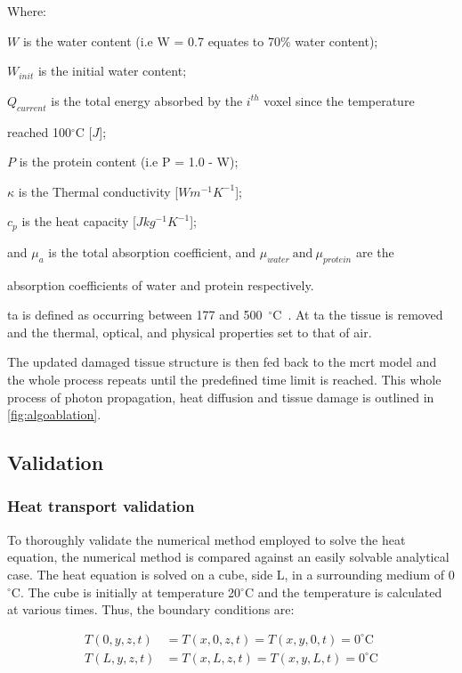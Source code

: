 \noindent Where:

\indent $W$ is the water content (i.e W = 0.7 equates to 70\% water content);

\indent $W_{init}$ is the initial water content;

\indent $Q_{current}$ is the total energy absorbed by the $i^{th}$ voxel since the temperature 

\indent reached 100$^{\circ}$C [$J$];

\indent $P$ is the protein content (i.e P = 1.0 - W);

\indent $\kappa$ is the Thermal conductivity [$W m^{-1} K^{-1}$];

\indent $c_p$ is the heat capacity [$J kg^{-1} K^{-1}$];

\indent and $\mu_a$ is the total absorption coefficient, and $\mu_{water}\ \text{and}\ \mu_{protein}$ are the

\indent absorption coefficients of water and protein respectively.

\medskip

\gls*{ta}  is defined as occurring between 177 and 500~$^{\circ}$C~\cite{gerstmann1994char,mckenzie1986three,sagi1992heating}. At \gls*{ta} the tissue is removed and the thermal, optical, and physical properties set to that of air.

The updated damaged tissue structure is then fed back to the \gls*{mcrt} model and the whole process repeats until the predefined time limit is reached. This whole process of photon propagation, heat diffusion and tissue damage is outlined in \cref{fig:algoablation}.

\subsection{Validation}

\subsubsection*{Heat transport validation}

To thoroughly validate the numerical method employed to solve the heat equation, the numerical method is compared against an easily solvable analytical case. The heat equation is solved on a cube, side L, in a surrounding medium of 0$^{\circ}$C. The cube is initially at temperature 20$^{\circ}$C and the temperature is calculated at various times. Thus, the boundary conditions are:

\begin{align}
T(0,y,z,t)&=T(x,0,z,t)=T(x,y,0,t)=0^{\circ}\text{C} \label{eqn:bc1}\\
T(L,y,z,t)&=T(x,L,z,t)=T(x,y,L,t)=0^{\circ}\text{C} \label{eqn:bc2}
\end{align}

